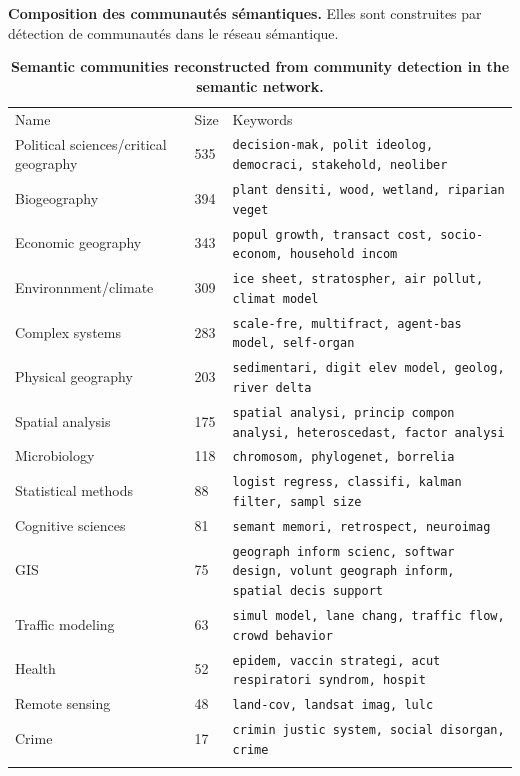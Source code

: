 \begin{table}
\caption{\textbf{Semantic communities reconstructed from community detection in the semantic network.}\label{tab:cybergeo:domains}}{\textbf{Composition des communautés sémantiques.} Elles sont construites par détection de communautés dans le réseau sémantique.\label{tab:cybergeo:domains}}
\hspace{-1cm}
\begin{tabular}{lll}
\hline\noalign{\smallskip}
Name & Size & Keywords  \\
\noalign{\smallskip}\hline\noalign{\smallskip}
Political sciences/critical geography & 535 & \texttt{decision-mak, polit ideolog, democraci, stakehold, neoliber} \\
Biogeography & 394 & \texttt{plant densiti, wood, wetland, riparian veget} \\
Economic geography & 343 &  \texttt{popul growth, transact cost, socio-econom, household incom} \\
Environnment/climate & 309 & \texttt{ice sheet, stratospher, air pollut, climat model} \\
Complex systems & 283 & \texttt{scale-fre, multifract, agent-bas model, self-organ} \\
Physical geography & 203 & \texttt{sedimentari, digit elev model, geolog, river delta} \\
Spatial analysis & 175 & \texttt{spatial analysi, princip compon analysi, heteroscedast, factor analysi} \\
Microbiology & 118 & \texttt{chromosom, phylogenet, borrelia} \\
Statistical methods & 88 & \texttt{logist regress, classifi, kalman filter, sampl size} \\
Cognitive sciences & 81 & \texttt{semant memori, retrospect, neuroimag} \\
GIS & 75 & \texttt{geograph inform scienc, softwar design, volunt geograph inform, spatial decis support} \\
Traffic modeling & 63 & \texttt{simul model, lane chang, traffic flow, crowd behavior} \\
Health & 52 & \texttt{epidem, vaccin strategi, acut respiratori syndrom, hospit} \\
Remote sensing & 48 & \texttt{land-cov, landsat imag, lulc} \\
Crime & 17 & \texttt{crimin justic system, social disorgan, crime} \\
\noalign{\smallskip}\hline
\end{tabular}
\end{table}



